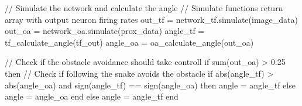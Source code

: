 // Simulate the network and calculate the angle
// Simulate functions return array with output neuron firing rates
out_tf = network_tf.simulate(image_data)
out_oa = network_oa.simulate(prox_data)
angle_tf = tf_calculate_angle(tf_out)
angle_oa = oa_calculate_angle(out_oa)

// Check if the obstacle avoidance should take controll
if sum(out_oa) > 0.25 then
	// Check if following the snake avoids the obstacle
	if abs(angle_tf) > abs(angle_oa) and sign(angle_tf) == sign(angle_oa) then
		angle = angle_tf
	else
		angle = angle_oa
	end
else
	angle = angle_tf
end
